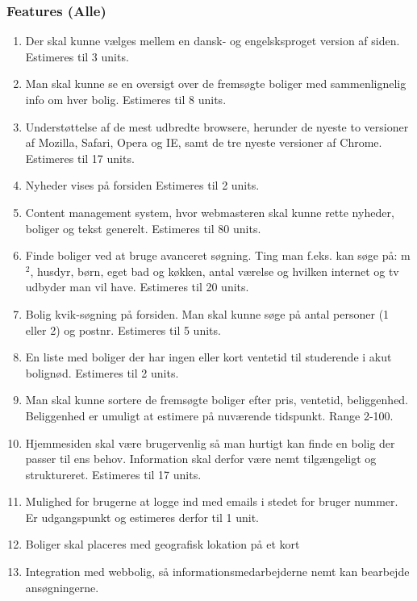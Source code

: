 \documentclass[12pt, a4paper]{report}
\begin{document}
\subsubsection{Features (Alle)}

\begin{enumerate}

\item Der skal kunne vælges mellem en dansk- og engelsksproget version af siden. Estimeres til 3 units.

\item Man skal kunne se en oversigt over de fremsøgte boliger med sammenlignelig info om hver bolig. Estimeres til 8 units.

\item Understøttelse af de mest udbredte browsere, herunder de nyeste to versioner af Mozilla, Safari, Opera og IE, samt de tre nyeste versioner af Chrome. Estimeres til 17 units.

\item Nyheder vises på forsiden Estimeres til 2 units.

\item Content management system, hvor webmasteren skal kunne rette nyheder, boliger og tekst generelt. Estimeres til 80 units.

\item Finde boliger ved at bruge avanceret søgning. Ting man f.eks. kan søge på: m$^{2}$, husdyr, børn, eget bad og køkken, antal værelse og hvilken internet og tv udbyder man vil have. Estimeres til 20 units.

\item Bolig kvik-søgning på forsiden. Man skal kunne søge på antal personer (1 eller 2) og postnr. Estimeres til 5 units.

\item En liste med boliger der har ingen eller kort ventetid til studerende i akut bolignød. Estimeres til 2 units.

\item Man skal kunne sortere de fremsøgte boliger efter pris, ventetid, beliggenhed. Beliggenhed er umuligt at estimere på nuværende tidspunkt. Range 2-100.

\item Hjemmesiden skal være brugervenlig så man hurtigt kan finde en bolig der passer til ens behov. Information skal derfor være nemt tilgængeligt og struktureret. Estimeres til 17 units.

\item Mulighed for brugerne at logge ind med emails i stedet for bruger nummer. Er udgangspunkt og estimeres derfor til 1 unit.

\item Boliger skal placeres med geografisk lokation på et kort

\item Integration med webbolig, så informationsmedarbejderne nemt kan bearbejde ansøgningerne.

\end{enumerate}
\end{document}
